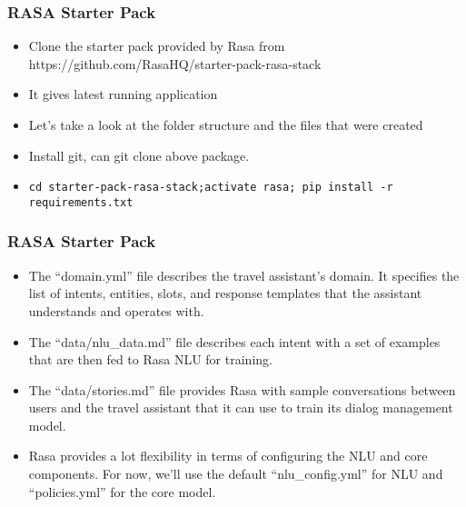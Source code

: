  \begin{frame}[fragile]\frametitle{RASA Starter Pack}
\begin{itemize}
\item Clone the starter pack provided by Rasa from https://github.com/RasaHQ/starter-pack-rasa-stack
\item It gives latest running application
\item Let’s take a look at the folder structure and the files that were created 
\item Install git, can git clone above package.
\item \lstinline|cd starter-pack-rasa-stack;activate rasa; pip install -r requirements.txt|

\end{itemize}
\end{frame}

 \begin{frame}[fragile]\frametitle{RASA Starter Pack}
\begin{itemize}
\item The “domain.yml” file describes the travel assistant’s domain. It specifies the list of intents, entities, slots, and response templates that the assistant understands and operates with.
\item The “data/nlu\_data.md” file describes each intent with a set of examples that are then fed to Rasa NLU for training.
\item The “data/stories.md” file provides Rasa with sample conversations between users and the travel assistant that it can use to train its dialog management model.
\item Rasa provides a lot flexibility in terms of configuring the NLU and core components. For now, we’ll use the default “nlu\_config.yml” for NLU and “policies.yml” for the core model.
\end{itemize}


\end{frame}

